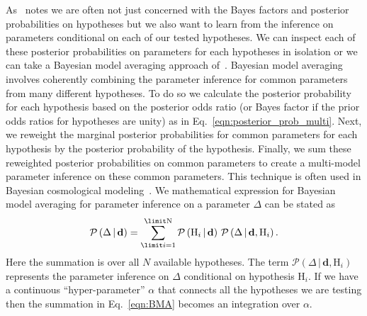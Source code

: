 As~\cite{read2006encyclopedia} notes we are often not just concerned with the Bayes factors and posterior probabilities on hypotheses but we also want to learn from the inference on parameters conditional on each of our tested hypotheses. We can inspect each of these posterior probabilities on parameters for each hypotheses in isolation or we can take a Bayesian model averaging approach of~\cite{kass1995bayes}. Bayesian model averaging involves coherently combining the parameter inference for common parameters from many different hypotheses. To do so we calculate the posterior probability for each hypothesis based on the posterior odds ratio (or Bayes factor if the prior odds ratios for hypotheses are unity) as in Eq.~\ref{eqn:posterior_prob_multi}. Next, we reweight the marginal posterior probabilities for common parameters for each hypothesis by the posterior probability of the hypothesis. Finally, we sum these reweighted posterior probabilities on common parameters to create a multi-model parameter inference on these common parameters. This technique is often used in Bayesian cosmological modeling~\cite{hobson2010bayesian}. We mathematical expression for Bayesian model averaging for parameter inference on a parameter $\Delta$ can be stated as
\begin{equation}\label{eqn:BMA}
    \mathcal{P} \left( \Delta \, | \, \mathbf{d}\right) = \sum_{\limit i=1}^{\limit \mathrm{N}}  \mathcal{P} \left(\mathrm{H}_i \, | \, \mathbf{d}\right) \,  \mathcal{P} \left(\Delta \, | \, \mathbf{d}, \mathrm{H}_i\right).
\end{equation}
Here the summation is over all $N$ available hypotheses. The term $\mathcal{P} \left(\Delta \, | \, \mathbf{d}, \mathrm{H}_i\right)$ represents the parameter inference on $\Delta$ conditional on hypothesis $\mathrm{H}_i$. If we have a continuous ``hyper-parameter'' $\alpha$ that connects all the hypotheses we are testing then the summation in Eq.~\ref{eqn:BMA} becomes an integration over $\alpha$. 

